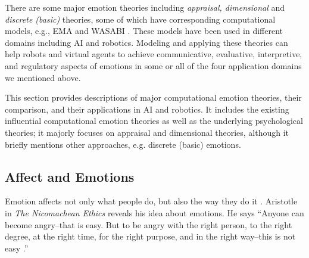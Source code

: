 \documentclass[12pt]{report}
\begin{document}
There are some major emotion theories including \textit{appraisal, dimensional}
and \textit{discrete (basic)} theories, some of which have corresponding
computational models, e.g., EMA \cite{marsella:ema-process-model} and WASABI
\cite{becker:wasabi,becker:wasabi-description}. These models have been used in
different domains including AI and robotics. Modeling and applying these
theories can help robots and virtual agents to achieve communicative,
evaluative, interpretive, and regulatory aspects of emotions in some or all of
the four application domains we mentioned above.

This section provides descriptions of major computational emotion theories,
their comparison, and their applications in AI and robotics. It includes the
existing influential computational emotion theories as well as the underlying
psychological theories; it majorly focuses on appraisal and dimensional
theories, although it briefly mentions other approaches, e.g. discrete (basic)
emotions.

\subsection{Affect and Emotions}
Emotion affects not only what people do, but also the way they do it
\cite{cowie:concepts-definitions}. Aristotle in \emph{The Nicomachean Ethics}
reveals his idea about emotions. He says ``Anyone can become angry--that is
easy. But to be angry with the right person, to the right degree, at the right
time, for the right purpose, and in the right way--this is not easy
\cite{aristotle:ethics}.''
\end{document}
